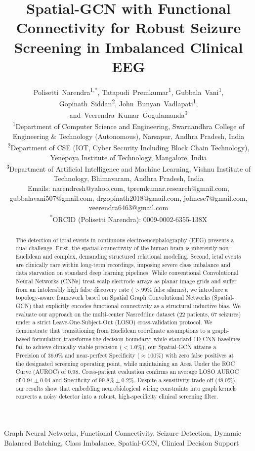 \documentclass[journal]{IEEEtran}
\title{Spatial-GCN with Functional Connectivity for Robust Seizure Screening in Imbalanced Clinical EEG}
\author{Polisetti~Narendra\textsuperscript{1,*},
        Tatapudi~Premkumar\textsuperscript{1},
        Gubbala~Vani\textsuperscript{1},
        Gopinath~Siddan\textsuperscript{2},
        John~Bunyan~Vadlapati\textsuperscript{1},
        and~Veerendra~Kumar~Gogulamanda\textsuperscript{3}\\[0.3em]
\small\textsuperscript{1}Department of Computer Science and Engineering, Swarnandhra College of Engineering \& Technology (Autonomous), Narsapur, Andhra Pradesh, India\\
\small\textsuperscript{2}Department of CSE (IOT, Cyber Security Including Block Chain Technology), Yenepoya Institute of Technology, Mangalore, India\\
\small\textsuperscript{3}Department of Artificial Intelligence and Machine Learning, Vishnu Institute of Technology, Bhimavaram, Andhra Pradesh, India\\
\small Emails: narendresh@yahoo.com, tpremkumar.research@gmail.com, gubbalavani507@gmail.com, drgopinath2018@gmail.com, johncse7@gmail.com, veerendra6463@gmail.com\\
\small\textsuperscript{*}ORCID (Polisetti Narendra): 0009-0002-6355-138X}
\begin{document}
\maketitle

\begin{abstract}
The detection of ictal events in continuous electroencephalography (EEG) presents a dual challenge. First, the spatial connectivity of the human brain is inherently non-Euclidean and complex, demanding structured relational modeling. Second, ictal events are clinically rare within long-term recordings, imposing severe class imbalance and data starvation on standard deep learning pipelines. While conventional Convolutional Neural Networks (CNNs) treat scalp electrode arrays as planar image grids and suffer from an intolerably high false discovery rate ($>99\%$ false alarms), we introduce a topology-aware framework based on Spatial Graph Convolutional Networks (Spatial-GCN) that explicitly encodes functional connectivity as a structural inductive bias. We evaluate our approach on the multi-center Nasreddine dataset (22 patients, 67 seizures) under a strict Leave-One-Subject-Out (LOSO) cross-validation protocol. We demonstrate that transitioning from Euclidean coordinate assumptions to a graph-based formulation transforms the decision boundary: while standard 1D-CNN baselines fail to achieve clinically viable precision ($<1.0\%$), our Spatial-GCN attains a Precision of 36.0\% and near-perfect Specificity ($\approx 100\%$) with zero false positives at the designated screening operating point, while maintaining an Area Under the ROC Curve (AUROC) of 0.98. Cross-patient evaluation confirms an average LOSO AUROC of $0.94 \pm 0.04$ and Specificity of $99.8\% \pm 0.2\%$. Despite a sensitivity trade-off (48.0\%), our results show that embedding neurobiological wiring constraints into graph kernels converts a noisy detector into a robust, high-specificity clinical screening filter.
\end{abstract}

\begin{IEEEkeywords}
Graph Neural Networks, Functional Connectivity, Seizure Detection, Dynamic Balanced Batching, Class Imbalance, Spatial-GCN, Clinical Decision Support
\end{IEEEkeywords}

\end{document}
